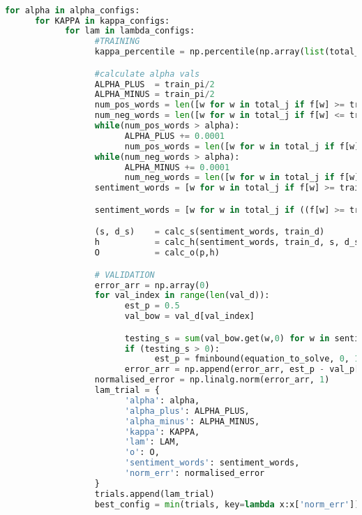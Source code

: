 \documentclass[ oneside,%
                    author={Joshua Felmeden},
                    degree={MEng},
                     title={Sentiment Analysis of Financial Headlines Based on Stock Returns},
                  subtitle={Research}]{dissertation}
\begin{document}
\begin{lstlisting}[float={!htb},caption={Original training and validation window},label={lst:train-val-orig},language=Python]

for alpha in alpha_configs:
      for KAPPA in kappa_configs:
            for lam in lambda_configs:
                  #TRAINING
                  kappa_percentile = np.percentile(np.array(list(total_j.values())),KAPPA) # return the nth percentile of all appearances for KAPPA

                  #calculate alpha vals
                  ALPHA_PLUS  = train_pi/2
                  ALPHA_MINUS = train_pi/2
                  num_pos_words = len([w for w in total_j if f[w] >= train_pi + ALPHA_PLUS and total_j[w] >= kappa_percentile])
                  num_neg_words = len([w for w in total_j if f[w] <= train_pi - ALPHA_MINUS and total_j[w] >= kappa_percentile])
                  while(num_pos_words > alpha):
                        ALPHA_PLUS += 0.0001
                        num_pos_words = len([w for w in total_j if f[w] >= train_pi + ALPHA_PLUS and total_j[w] >= kappa_percentile])
                  while(num_neg_words > alpha):
                        ALPHA_MINUS += 0.0001
                        num_neg_words = len([w for w in total_j if f[w] <= train_pi - ALPHA_MINUS and total_j[w] >= kappa_percentile])
                  sentiment_words = [w for w in total_j if f[w] >= train_pi + ALPHA_PLUS and total_j[w] >= kappa_percentile])

                  sentiment_words = [w for w in total_j if ((f[w] >= train_pi + ALPHA_PLUS or f[w] <= train_pi - ALPHA_MINUS) and total_j[w] >= kappa_percentile)]

                  (s, d_s)    = calc_s(sentiment_words, train_d)
                  h           = calc_h(sentiment_words, train_d, s, d_s)
                  O           = calc_o(p,h)

                  # VALIDATION
                  error_arr = np.array(0)
                  for val_index in range(len(val_d)):
                        est_p = 0.5
                        val_bow = val_d[val_index]

                        testing_s = sum(val_bow.get(w,0) for w in sentiment_words)
                        if (testing_s > 0):
                              est_p = fminbound(equation_to_solve, 0, 1, (O,val_bow, sentiment_words,testing_s,LAM))
                        error_arr = np.append(error_arr, est_p - val_p[val_index])
                  normalised_error = np.linalg.norm(error_arr, 1)
                  lam_trial = {
                        'alpha': alpha,
                        'alpha_plus': ALPHA_PLUS,
                        'alpha_minus': ALPHA_MINUS,
                        'kappa': KAPPA,
                        'lam': LAM,
                        'o': O,
                        'sentiment_words': sentiment_words,
                        'norm_err': normalised_error
                  }
                  trials.append(lam_trial)
                  best_config = min(trials, key=lambda x:x['norm_err'])
\end{lstlisting}
\end{document}
